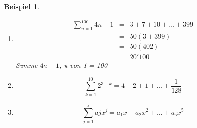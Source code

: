 \documentclass{report}
\newtheorem{myexample}{Beispiel}
\begin{document}
\begin{myexample}
	\begin{enumerate}
		\item
			\begin{eqnarray*}
				\sum_{n=1}^{100} 4n-1 &=& 3+7+10+\ldots+399\\
				&=& 50(3+399)\\
				&=& 50(402)\\
				&=& 20'100
			\end{eqnarray*}
			Summe $4n-1$, n von 1 = 100
		\item
			\begin{equation*}
				\sum_{k=1}^{10} 2^{3-k} = 4 + 2 + 1 + \ldots + \frac{1}{128}
			\end{equation*}
		\item
			\begin{equation*}
				\sum_{j=1}^{5} ajx^j  = a_1x + a_2x^2 + \ldots + a_5x^5
			\end{equation*}			
	\end{enumerate}
\end{myexample}
\newpage
\end{document}
